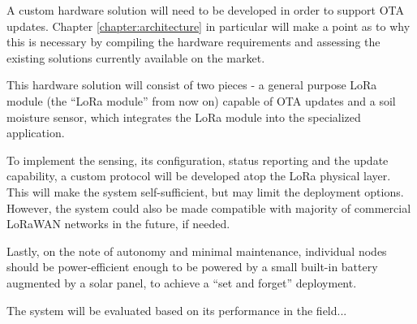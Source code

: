 A custom hardware solution will need to be developed in order to support OTA updates. Chapter \ref{chapter:architecture} in particular will make a point as to why this is necessary by compiling the hardware requirements and assessing the existing solutions currently available on the market. 

This hardware solution will consist of two pieces - a general purpose LoRa module (the ``LoRa module'' from now on) capable of OTA updates and a soil moisture sensor, which integrates the LoRa module into the specialized application.

To implement the sensing, its configuration, status reporting and the update capability, a custom protocol will be developed atop the LoRa physical layer. This will make the system self-sufficient, but may limit the deployment options. However, the system could also be made compatible with majority of commercial LoRaWAN networks in the future, if needed.

Lastly, on the note of autonomy and minimal maintenance, individual nodes should be power-efficient enough to be powered by a small built-in battery augmented by a solar panel, to achieve a ``set and forget'' deployment.

The system will be evaluated based on its performance in the field...
